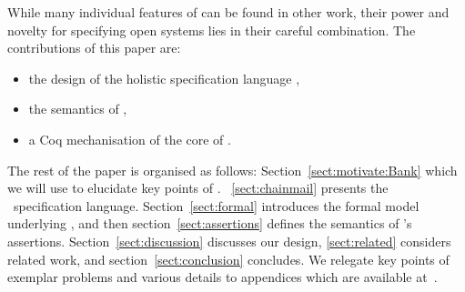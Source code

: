 
While many individual features of \Chainmail can be found in other work, 
their power and novelty for specifying open systems lies in their careful combination.
The contributions of this paper are:
\begin{itemize}
\item the design of the holistic specification language \Chainmail,
\item the semantics of \Chainmail, 
\item a Coq mechanisation of the core of \Chainmail.
\end{itemize}  
  
  
The rest of the paper is organised as follows:
Section~\ref{sect:motivate:Bank} 
 which we will use 
to elucidate key points of \Chainmail.
~\ref{sect:chainmail} presents the \Chainmail\ specification
language.  Section~\ref{sect:formal} introduces the formal model
underlying \Chainmail, and then section~\ref{sect:assertions} defines
the 
semantics of \Chainmail's assertions.
Section~\ref{sect:discussion}
discusses our design, \ref{sect:related} considers related
work, and section~\ref{sect:conclusion} concludes.
We relegate key points of exemplar problems and various details to appendices which are available at~\cite{examples}.
